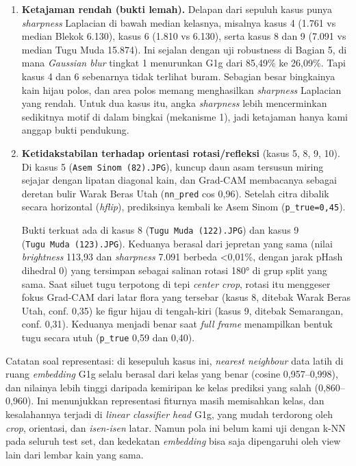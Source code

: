 \documentclass[10pt,a4paper]{article}
\begin{document}
\begin{enumerate}
\def\labelenumi{\arabic{enumi}.}
\setcounter{enumi}{2}
\item
  \textbf{Ketajaman rendah (bukti lemah).} Delapan dari sepuluh kasus punya \emph{sharpness} Laplacian di bawah median kelasnya, misalnya kasus 4 (1.761 vs median Blekok 6.130), kasus 6 (1.810 vs 6.130), serta kasus 8 dan 9 (7.091 vs median Tugu Muda 15.874). Ini sejalan dengan uji robustness di Bagian 5, di mana \emph{Gaussian blur} tingkat 1 menurunkan G1g dari 85,49\% ke 26,09\%. Tapi kasus 4 dan 6 sebenarnya tidak terlihat buram. Sebagian besar bingkainya kain hijau polos, dan area polos memang menghasilkan \emph{sharpness} Laplacian yang rendah. Untuk dua kasus itu, angka \emph{sharpness} lebih mencerminkan sedikitnya motif di dalam bingkai (mekanisme 1), jadi ketajaman hanya kami anggap bukti pendukung.
\item
  \textbf{Ketidakstabilan terhadap orientasi rotasi/refleksi} (kasus 5, 8, 9, 10).
  Di kasus 5 (\texttt{Asem\ Sinom\ (82).JPG}), kuncup daun asam tersusun miring sejajar dengan lipatan diagonal kain, dan Grad-CAM membacanya sebagai deretan bulir Warak Beras Utah (\texttt{nn\_\allowbreak{}pred} cos 0,96). Setelah citra dibalik secara horizontal (\emph{hflip}), prediksinya kembali ke Asem Sinom (\texttt{p\_\allowbreak{}true=0,\allowbreak{}45}).

  Bukti terkuat ada di kasus 8 (\texttt{Tugu\ Muda\ (122).JPG}) dan kasus 9 (\texttt{Tugu\ Muda\ (123).JPG}). Keduanya berasal dari jepretan yang sama (nilai \emph{brightness} 113,93 dan \emph{sharpness} 7.091 berbeda \textless0,01\%, dengan jarak pHash dihedral 0) yang tersimpan sebagai salinan rotasi 180° di grup split yang sama. Saat siluet tugu terpotong di tepi \emph{center crop}, rotasi itu menggeser fokus Grad-CAM dari latar flora yang tersebar (kasus 8, ditebak Warak Beras Utah, conf. 0,35) ke figur hijau di tengah-kiri (kasus 9, ditebak Semarangan, conf. 0,31). Keduanya menjadi benar saat \emph{full frame} menampilkan bentuk tugu secara utuh (\texttt{p\_\allowbreak{}true} 0,59 dan 0,40).
\end{enumerate}

Catatan soal representasi: di kesepuluh kasus ini, \emph{nearest neighbour} data latih di ruang \emph{embedding} G1g selalu berasal dari kelas yang benar (cosine 0,957--0,998), dan nilainya lebih tinggi daripada kemiripan ke kelas prediksi yang salah (0,860--0,960). Ini menunjukkan representasi fiturnya masih memisahkan kelas, dan kesalahannya terjadi di \emph{linear classifier head} G1g, yang mudah terdorong oleh \emph{crop}, orientasi, dan \emph{isen-isen} latar. Namun pola ini belum kami uji dengan k-NN pada seluruh test set, dan kedekatan \emph{embedding} bisa saja dipengaruhi oleh view lain dari lembar kain yang sama.
\end{document}
